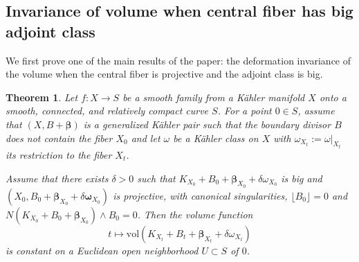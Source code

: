 \documentclass[12pt]{amsart}
\numberwithin{equation}{section}
\newtheorem{theorem} {Theorem} [section]
\theoremstyle{definition}
\theoremstyle{plain}
\newtheorem*{thm A*}{Theorem A}
\newtheorem*{thm B*}{Theorem B}
\newtheorem*{thm C*}{Theorem C}
\newtheorem*{thm D*}{Theorem D}
\theoremstyle{definition}
\renewcommand{\1}{\mathds{1}}
\newcommand{\bbeta}{\boldsymbol{\beta}}
\renewcommand{\>}{\rightarrow}
\begin{document}
\subsection{Invariance of volume when central fiber has big adjoint class}
We first prove one of the main results of the paper: the deformation invariance of the volume when the central fiber is projective and the adjoint class is big. 
\begin{theorem}\label{InvarVol}
Let $f: X \to S$ be a smooth family from a K\"ahler manifold $X$ onto a smooth, connected, and relatively compact curve $S$. For a point $0\in S$, assume that $(X,B + \bbeta)$ is a generalized K\"ahler pair such that the boundary divisor $B$ does not contain the fiber $X_0$ and let $\omega$ be a K\"ahler class on $X$ with $\omega_{X_t}:=\omega|_{X_t}$ its restriction to the fiber $X_t$. 

Assume that there exists $\delta>0$ such that $K_{X_0} + B_0 +  \boldsymbol{\beta}_{X_0}+\delta {\omega}_{X_0}$ is big and $(X_0, B_0+  { \boldsymbol{\beta}}_{X_0}+ \delta\boldsymbol{\omega}_{X_0})$ is projective, with canonical singularities, $\lfloor{ B_0\rfloor} = 0$ and $N(K_{X_0 }+B_0 + \bbeta_{X_0})\wedge B_0  = 0$. Then the volume  function 
$$t \longmapsto \mathrm{vol}(K_{X_t}+B_t +  \boldsymbol{\beta}_{X_t} +\delta{\omega}_{X_t})$$ 
is constant on a Euclidean open neighborhood $U \subset S$ of $0$.
\end{theorem}
\end{document}
